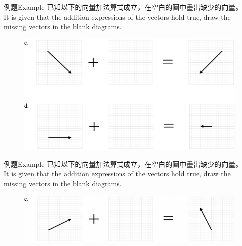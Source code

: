 \documentclass[beamer=true]{standalone}
\begin{document}
\begin{frame}{例題Example}
    已知以下的向量加法算式成立，在空白的圖中畫出缺少的向量。 \\It is given that the addition expressions of the vectors hold true, draw the missing vectors in the blank diagrams.
    \begin{figure}[h!]
        \centering
        \includegraphics[width=\textwidth]{../../assets/9088f28e.png}
    \end{figure}
\end{frame}
\begin{frame}[t]{例題Example}
    已知以下的向量加法算式成立，在空白的圖中畫出缺少的向量。 \\It is given that the addition expressions of the vectors hold true, draw the missing vectors in the blank diagrams.\bigskip
    \begin{figure}[h!]
        \centering
        \includegraphics[width=\textwidth]{../../assets/6767fde4.png}
    \end{figure}
\end{frame}
\end{document}
